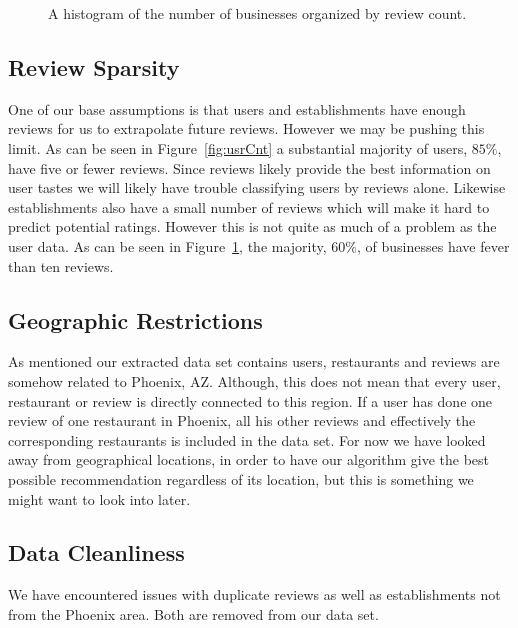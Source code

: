 \documentclass[10pt,twocolumn,letterpaper]{article}
\begin{document}
\begin{figure}[t]
\begin{center}
\end{center}
   \caption{A histogram of the number of businesses organized by review count.}
\label{fig:bizCnt}
\end{figure}

\subsection{Review Sparsity}
One of our base assumptions is that users and establishments have enough reviews for us to extrapolate future reviews. However we may be pushing this limit. As can be seen in Figure~\ref{fig:usrCnt} a substantial majority of users, $85\%$, have five or fewer reviews. Since reviews likely provide the best information on user tastes we will likely have trouble classifying users by reviews alone. Likewise establishments also have a small number of reviews which will make it hard to predict potential ratings. However this is not quite as much of a problem as the user data. As can be seen in Figure~\ref{fig:bizCnt}, the majority, $60\%$, of businesses have fever than ten reviews.

\subsection{Geographic Restrictions}
As mentioned our extracted data set contains users, restaurants and reviews are somehow related to Phoenix, AZ. Although, this does not mean that every user, restaurant or review is directly connected to this region. If a user has done one review of one restaurant in Phoenix, all his other reviews and effectively the corresponding restaurants is included in the data set. For now we have looked away from geographical locations, in order to have our algorithm give the best possible recommendation regardless of its location, but this is something we might want to look into later.

\subsection{Data Cleanliness}
We have encountered issues with duplicate reviews as well as establishments not from the Phoenix area. Both are removed from our data set.

{\small
}
\end{document}

